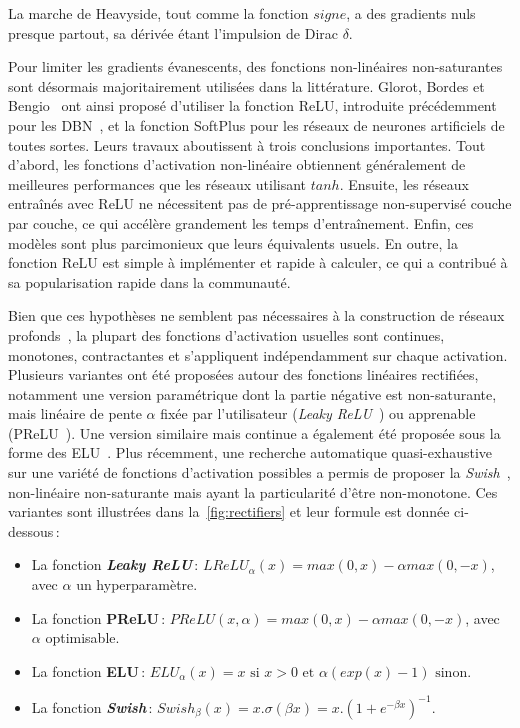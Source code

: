 La marche de Heavyside, tout comme la fonction $signe$, a des gradients nuls presque partout, sa dérivée étant l'impulsion de Dirac $\delta$.

Pour limiter les gradients évanescents, des fonctions non-linéaires non-saturantes sont désormais majoritairement utilisées dans la littérature. Glorot, Bordes et Bengio~\cite{glorot_deep_2011} ont ainsi proposé d'utiliser la fonction \gls{ReLU}, introduite précédemment pour les \gls{DBN}~\cite{nair_rectified_2010}, et la fonction SoftPlus pour les réseaux de neurones artificiels de toutes sortes. Leurs travaux aboutissent à trois conclusions importantes. Tout d'abord, les fonctions d'activation non-linéaire obtiennent généralement de meilleures performances que les réseaux utilisant $tanh$. Ensuite, les réseaux entraînés avec \gls{ReLU} ne nécessitent pas de pré-apprentissage non-supervisé couche par couche, ce qui accélère grandement les temps d'entraînement. Enfin, ces modèles sont plus parcimonieux que leurs équivalents usuels. En outre, la fonction \gls{ReLU} est simple à implémenter et rapide à calculer, ce qui a contribué à sa popularisation rapide dans la communauté.

Bien que ces hypothèses ne semblent pas nécessaires à la construction de réseaux profonds~\cite{oyallon_building_2017}, la plupart des fonctions d'activation usuelles sont continues, monotones, contractantes et s'appliquent indépendamment sur chaque activation. Plusieurs variantes ont été proposées autour des fonctions linéaires rectifiées, notamment une version paramétrique dont la partie négative est non-saturante, mais linéaire de pente $\alpha$ fixée par l'utilisateur (\emph{Leaky ReLU}~\cite{maas_rectifier_2013}) ou apprenable (\gls{PReLU}~\cite{he_delving_2015}). Une version similaire mais continue a également été proposée sous la forme des \gls{ELU}~\cite{clevert_fast_2015}. Plus récemment, une recherche automatique quasi-exhaustive sur une variété de fonctions d'activation possibles a permis de proposer la \emph{Swish}~\cite{ramachandran_searching_2018}, non-linéaire non-saturante mais ayant la particularité d'être non-monotone. Ces variantes sont illustrées dans la~\cref{fig:rectifiers} et leur formule est donnée ci-dessous\,:
\begin{itemize}
  \item La fonction \textbf{\emph{Leaky ReLU}}\,: $LReLU_\alpha(x) = max(0,x) - \alpha max(0,-x)$, avec $\alpha$ un hyperparamètre.
  \item La fonction \textbf{\gls{PReLU}}\,: $PReLU(x, \alpha) = max(0,x) - \alpha max(0,-x)$, avec $\alpha$ optimisable.
  \item La fonction \textbf{\gls{ELU}}\,: $ELU_\alpha(x) = x \text{ si } x > 0 \text{ et } \alpha (exp(x) - 1) \text{ sinon}$.
  \item La fonction \textbf{\emph{Swish}}\,: $Swish_\beta(x) = x . \sigma(\beta x) = x . (1 + e^{-\beta x})^{-1}$.
\end{itemize}

